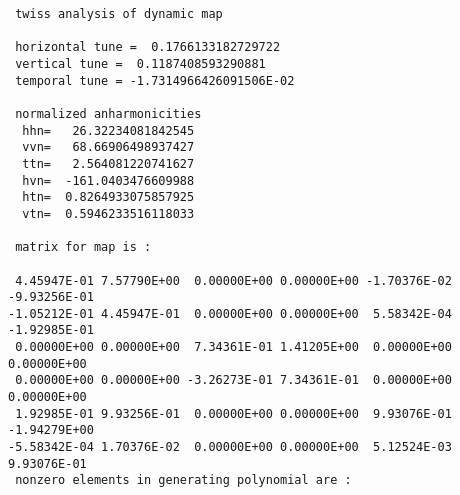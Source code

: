{\begin{verbatim}
 twiss analysis of dynamic map

 horizontal tune =  0.1766133182729722
 vertical tune =  0.1187408593290881
 temporal tune = -1.7314966426091506E-02

 normalized anharmonicities
  hhn=   26.32234081842545
  vvn=   68.66906498937427
  ttn=   2.564081220741627
  hvn=  -161.0403476609988
  htn=  0.8264933075857925
  vtn=  0.5946233516118033

 matrix for map is :

 4.45947E-01 7.57790E+00  0.00000E+00 0.00000E+00 -1.70376E-02 -9.93256E-01
-1.05212E-01 4.45947E-01  0.00000E+00 0.00000E+00  5.58342E-04 -1.92985E-01
 0.00000E+00 0.00000E+00  7.34361E-01 1.41205E+00  0.00000E+00  0.00000E+00
 0.00000E+00 0.00000E+00 -3.26273E-01 7.34361E-01  0.00000E+00  0.00000E+00
 1.92985E-01 9.93256E-01  0.00000E+00 0.00000E+00  9.93076E-01 -1.94279E+00
-5.58342E-04 1.70376E-02  0.00000E+00 0.00000E+00  5.12524E-03  9.93076E-01
 nonzero elements in generating polynomial are :


\end{verbatim}}

